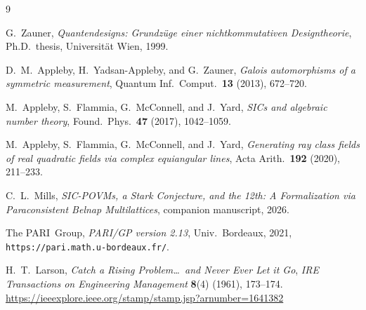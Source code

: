 \documentclass[12pt,a4paper]{article}
\begin{document}
\begin{thebibliography}{9}

G.\ Zauner, \emph{Quantendesigns: Grundz\"uge einer nichtkommutativen
Designtheorie}, Ph.D.\ thesis, Universit\"at Wien, 1999.

D.\ M.\ Appleby, H.\ Yadsan-Appleby, and G.\ Zauner,
\emph{Galois automorphisms of a symmetric measurement},
Quantum Inf.\ Comput.\ \textbf{13} (2013), 672--720.

M.\ Appleby, S.\ Flammia, G.\ McConnell, and J.\ Yard,
\emph{SICs and algebraic number theory},
Found.\ Phys.\ \textbf{47} (2017), 1042--1059.

M.\ Appleby, S.\ Flammia, G.\ McConnell, and J.\ Yard,
\emph{Generating ray class fields of real quadratic fields via complex
equiangular lines}, Acta Arith.\ \textbf{192} (2020), 211--233.

C.\ L.\ Mills, \emph{SIC-POVMs, a Stark Conjecture, and the 12th:
A Formalization via Paraconsistent Belnap Multilattices}, companion
manuscript, 2026.

The PARI~Group, \emph{PARI/GP version 2.13}, Univ.\ Bordeaux, 2021,
\texttt{https://pari.math.u-bordeaux.fr/}.

H.\ T.\ Larson,
\textit{Catch a Rising Problem\ldots\ and Never Ever Let it Go},
\emph{IRE Transactions on Engineering Management} \textbf{8}(4) (1961), 173--174.
\url{https://ieeexplore.ieee.org/stamp/stamp.jsp?arnumber=1641382}

\end{thebibliography}
\end{document}

